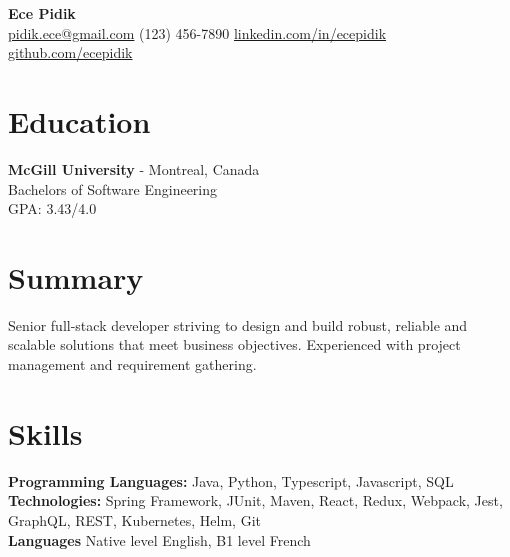 \documentclass[a4paper,10pt]{article}
\begin{document}
\begin{center}
    {\fontsize{18}{18}\textbf{Ece Pidik}\selectfont} \\
    \vspace{0.1em}
    \href{mailto:pidik.ece@gmail.com}{pidik.ece@gmail.com} \textbullet{} 
    (123) 456-7890 \textbullet{} 
    \href{https://www.linkedin.com/in/ecepidik}{linkedin.com/in/ecepidik} \textbullet{} 
    \href{github.com/ecepidik}{github.com/ecepidik}
\end{center}

\vspace{-0.4cm}
\noindent
\begin{minipage}[t]{0.38\textwidth}
    \section*{Education}
    \noindent
    \textbf {\large McGill University} - Montreal, Canada \\
    Bachelors of Software Engineering\\
    GPA: 3.43/4.0
\end{minipage}%
\hfill
\begin{minipage}[t]{0.58\textwidth}
    \section*{Summary}
    \noindent
    Senior full-stack developer striving to design and build robust, reliable and scalable solutions that meet business objectives. Experienced with project management and requirement gathering.
\end{minipage}

\vspace{-0.3cm}
\section*{Skills}
\noindent
\textbf{Programming Languages:} Java, Python, Typescript, Javascript, SQL \\
\textbf{Technologies:} Spring Framework, JUnit, Maven, React, Redux, Webpack, Jest, GraphQL, REST, Kubernetes, Helm, Git \\
\textbf{Languages}
Native level English,
B1 level French

\vspace{-0.3cm}
\end{document}
